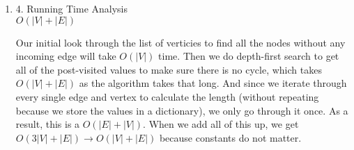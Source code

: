 \documentclass[11pt]{article}
\newenvironment{qparts}{\begin{enumerate}[{(}a{)}]}{\end{enumerate}}
\begin{document}
\begin{qparts}
We know that every single node is a class, which takes one semester to complete. Hence why if there are no children, we return 1 because that's the absolute number of semesters we need to take to complete the class. And as we recurse up a level, the node in the level above should choose the child with the highest number of required history and add one because we are looking for the highest depth. 
\item[4.] Running Time Analysis \\
$O(|V|+|E|)$

Our initial look through the list of verticies to find all the nodes without any incoming edge will take $O(|V|)$ time. Then we do depth-first search to get all of the post-visited values to make sure there is no cycle, which takes $O(|V|+|E|)$ as the algorithm takes that long. And since we iterate through every single edge and vertex to calculate the length (without repeating because we store the values in a dictionary), we only go through it once. As a result, this is a $O(|E|+|V|)$. When we add all of this up, we get $O(3|V| + |E|) \rightarrow O(|V|+|E|)$ because constants do not matter.
\end{qparts}
\end{document}
